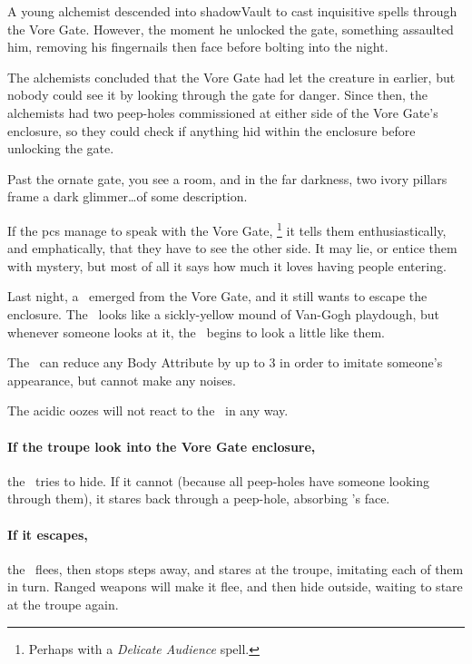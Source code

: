 \begin{multicols}{2}
\begin{exampletext}
  A young alchemist descended into \gls{shadowVault} to cast inquisitive spells through the Vore Gate.
  However, the moment he unlocked the gate, something assaulted him, removing his fingernails then face before bolting into the night.

  The alchemists concluded that the Vore Gate had let the creature in earlier, but nobody could see it by looking through the gate for danger.
  Since then, the alchemists had two peep-holes commissioned at either side of the Vore Gate's enclosure, so they could check if anything hid within the enclosure before unlocking the gate.
\end{exampletext}

\begin{boxtext}
  Past the ornate gate, you see a room, and in the far darkness, two ivory pillars frame a dark glimmer\ldots of some description.
\end{boxtext}

If the \glspl{pc} manage to speak with the Vore Gate,%
\footnote{Perhaps with a \textit{Delicate Audience} spell.}
it tells them enthusiastically, and emphatically, that they have to see the other side.
It may lie, or entice them with mystery, but most of all it says how much it loves having people entering.

Last night, a \superWierdzi\ emerged from the Vore Gate, and it still wants to escape the enclosure.
The \superWierdzi\ looks like a sickly-yellow mound of Van-Gogh playdough, but whenever someone looks at it, the \superWierdzi\ begins to look a little like them.

The \superWierdzi\ can reduce any Body Attribute by up to 3 in order to imitate someone's appearance, but cannot make any noises.

The acidic oozes will not react to the \superWierdzi\ in any way.

\paragraph{If the troupe look into the Vore Gate enclosure,}
the \superWierdzi\ tries to hide.
If it cannot (because all peep-holes have someone looking through them), it stares back through a peep-hole, absorbing 's face.

\paragraph{If it escapes,}
the \superWierdzi\ flees, then stops steps away, and stares at the troupe, imitating each of them in turn.
Ranged weapons will make it flee, and then hide outside, waiting to stare at the troupe again.


\end{multicols}
